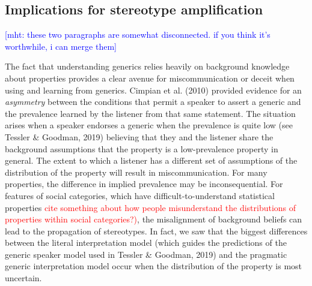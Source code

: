 \documentclass[floatsintext,doc]{apa6}
\newcommand{\mht}[1]{{\textcolor{Blue}{[mht: #1]}}}
\newcommand{\red}[1]{{\textcolor{Red}{#1}}}
\begin{document}


\subsection{Implications for stereotype amplification}

\mht{these two paragraphs are somewhat disconnected. if you think it's worthwhile, i can merge them}

The fact that understanding generics relies heavily on background knowledge about properties provides a clear avenue for miscommunication or deceit when using and learning from generics.
Cimpian et al. (2010) provided evidence for an \emph{asymmetry} between the conditions that permit a speaker to assert a generic and the prevalence learned by the listener from that same statement. 
The situation arises when a speaker endorses a generic when the prevalence is quite low (see Tessler \& Goodman, 2019) believing that they and the listener share the background assumptions that the property is a low-prevalence property in general.
The extent to which a listener has a different set of assumptions of the distribution of the property will result in miscommunication.
For many properties, the difference in implied prevalence may be inconsequential.
For features of social categories, which have difficult-to-understand statistical properties \red{cite something about how people misunderstand the distributions of properties within social categories?)}, the misalignment of background  beliefs can lead to the propagation of stereotypes.
In fact, we saw that the biggest differences between the literal interpretation model (which guides the predictions of the generic speaker model used in Tessler \& Goodman, 2019) and the pragmatic generic interpretation model occur when the distribution of the property is most uncertain.
\end{document}
